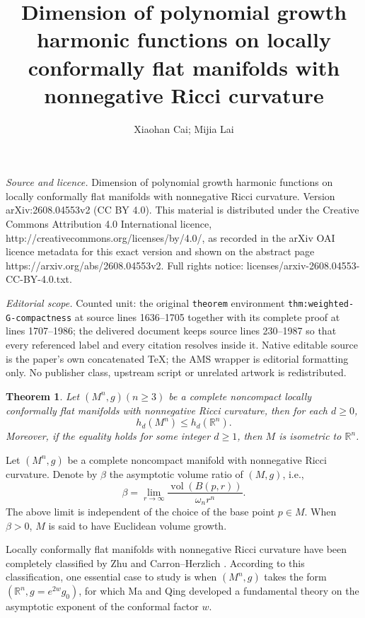 \documentclass[10pt,a4paper]{amsart}
\newtheorem{theoremx}{Theorem}
\numberwithin{equation}{section}
\begin{document}
\title[Dimension of polynomial growth harmonic functions on locally]{Dimension of polynomial growth harmonic functions on locally conformally flat manifolds with nonnegative Ricci curvature}
\author{Xiaohan Cai; Mijia Lai}
\date{}
\maketitle
\noindent\emph{Source and licence.} Dimension of polynomial growth harmonic functions on locally conformally flat manifolds with nonnegative Ricci curvature. Version arXiv:2608.04553v2 (CC BY 4.0). This material is distributed under the Creative Commons Attribution 4.0 International licence, http://creativecommons.org/licenses/by/4.0/, as recorded in the arXiv OAI licence metadata for this exact version and shown on the abstract page https://arxiv.org/abs/2608.04553v2. Full rights notice: licenses/arxiv-2608.04553-CC-BY-4.0.txt.\par\smallskip
\noindent\textit{Editorial scope.} Counted unit: the original \texttt{theorem} environment \texttt{thm:weighted-G-compactness} at source lines 1636--1705 together with its complete proof at lines 1707--1986; the delivered document keeps source lines 230--1987 so that every referenced label and every citation resolves inside it. Native editable source is the paper's own concatenated TeX; the AMS wrapper is editorial formatting only. No publisher class, upstream script or unrelated artwork is redistributed.
\begin{theoremx} \label{thm:A}
Let $(M^n,g) (n\geq 3)$ be a complete noncompact locally conformally flat manifolds with nonnegative Ricci curvature, then for each $d\geq 0$,
\[
h_d(M^n) \leq h_d (\mathbb{R}^n). 
\]
Moreover, if the equality holds for some integer $d\geq 1$, then $M$ is isometric to $\mathbb{R}^n$.    
\end{theoremx}

Let  $(M^n,g)$ be a complete noncompact manifold with nonnegative Ricci curvature. Denote by $\beta$ the asymptotic volume ratio of $(M,g)$, i.e., \[
    \beta=\lim_{r\to \infty}\frac{\operatorname{vol}(B(p,r))}{\omega_nr^n}.
    \]
The above limit is independent of the choice of the base point $p\in M$. When $\beta>0$, $M$ is said to have Euclidean volume growth.

Locally conformally flat manifolds with nonnegative Ricci curvature have been completely classified by Zhu \cite{Z} and Carron--Herzlich \cite{CH}. According to this classification, one essential case to study is when $(M^n, g)$ takes the form $(\mathbb{R}^n, g=e^{2w}g_0)$, for which Ma and Qing \cite{MQ} developed a fundamental theory on the asymptotic exponent of the conformal factor $w$.
\end{document}
